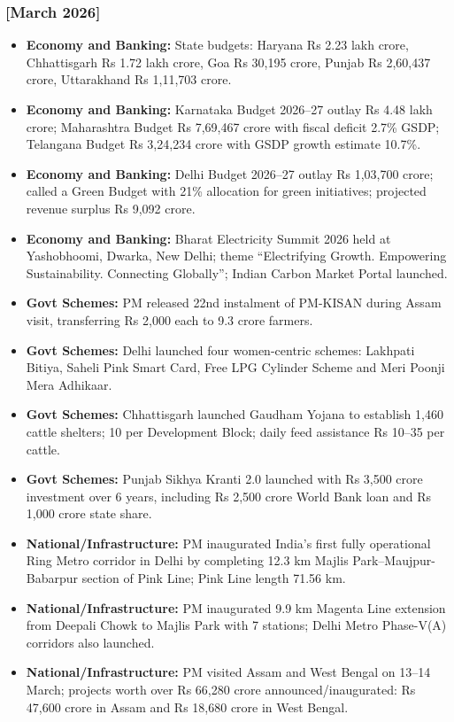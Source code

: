 \documentclass[10pt,a4paper]{article}
\newcommand{\monthtag}[1]{\textbf{[#1]}}
\begin{document}
\subsubsection{\monthtag{March 2026}}
\begin{itemize}
    \item \textbf{Economy and Banking:} State budgets: Haryana Rs 2.23 lakh crore, Chhattisgarh Rs 1.72 lakh crore, Goa Rs 30,195 crore, Punjab Rs 2,60,437 crore, Uttarakhand Rs 1,11,703 crore.
    \item \textbf{Economy and Banking:} Karnataka Budget 2026--27 outlay Rs 4.48 lakh crore; Maharashtra Budget Rs 7,69,467 crore with fiscal deficit 2.7\% GSDP; Telangana Budget Rs 3,24,234 crore with GSDP growth estimate 10.7\%.
    \item \textbf{Economy and Banking:} Delhi Budget 2026--27 outlay Rs 1,03,700 crore; called a Green Budget with 21\% allocation for green initiatives; projected revenue surplus Rs 9,092 crore.
    \item \textbf{Economy and Banking:} Bharat Electricity Summit 2026 held at Yashobhoomi, Dwarka, New Delhi; theme ``Electrifying Growth. Empowering Sustainability. Connecting Globally''; Indian Carbon Market Portal launched.
    \item \textbf{Govt Schemes:} PM released 22nd instalment of PM-KISAN during Assam visit, transferring Rs 2,000 each to 9.3 crore farmers.
    \item \textbf{Govt Schemes:} Delhi launched four women-centric schemes: Lakhpati Bitiya, Saheli Pink Smart Card, Free LPG Cylinder Scheme and Meri Poonji Mera Adhikaar.
    \item \textbf{Govt Schemes:} Chhattisgarh launched Gaudham Yojana to establish 1,460 cattle shelters; 10 per Development Block; daily feed assistance Rs 10--35 per cattle.
    \item \textbf{Govt Schemes:} Punjab Sikhya Kranti 2.0 launched with Rs 3,500 crore investment over 6 years, including Rs 2,500 crore World Bank loan and Rs 1,000 crore state share.
    \item \textbf{National/Infrastructure:} PM inaugurated India's first fully operational Ring Metro corridor in Delhi by completing 12.3 km Majlis Park--Maujpur-Babarpur section of Pink Line; Pink Line length 71.56 km.
    \item \textbf{National/Infrastructure:} PM inaugurated 9.9 km Magenta Line extension from Deepali Chowk to Majlis Park with 7 stations; Delhi Metro Phase-V(A) corridors also launched.
    \item \textbf{National/Infrastructure:} PM visited Assam and West Bengal on 13--14 March; projects worth over Rs 66,280 crore announced/inaugurated: Rs 47,600 crore in Assam and Rs 18,680 crore in West Bengal.

\end{itemize}
\end{document}
